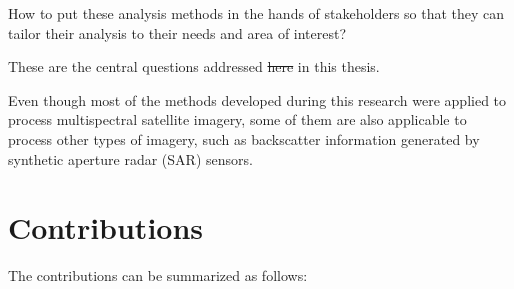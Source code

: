 How to put these analysis methods in the hands of stakeholders so that they can tailor their analysis to their needs and area of interest?

These are the central questions addressed \st {here} in this thesis.

Even though most of the methods developed during this research were applied to process multispectral satellite imagery, some of them are also applicable to process other types of imagery, such as backscatter information generated by synthetic aperture radar (SAR) sensors.

\bigskip

\section{Contributions}

The contributions can be summarized as follows:

